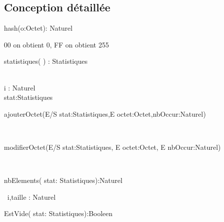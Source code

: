     \subsection*{Conception détaillée}
    
    \begin{function}
        \SetAlgoLined
        \caption{hash(o:Octet): Naturel} 
         00 on obtient 0, FF on obtient 255
    \end{function}

    \begin{function}
        \SetAlgoLined
        \caption{statistiques( ) :  Statistiques} 
        \Declaration \\
            i : Naturel\\
            stat:Statistiques\\
    \end{function}

        
    \begin{procedure}
        \SetAlgoLined
        \caption{ajouterOctet(E/S stat:Statistiques,E octet:Octet,nbOccur:Naturel)}
         \\
    \end{procedure}
        
    \begin{procedure}
        \SetAlgoLined
        \caption{modifierOctet(E/S stat:Statistiques, E octet:Octet, E nbOccur:Naturel)}
         \\
    \end{procedure}

    \begin{function}
        \SetAlgoLined
        \caption{nbElements( stat:  Statistiques):Naturel} 
        \Declaration\ i,taille : Naturel\\
    \end{function}

    \begin{function}
        \SetAlgoLined
        \caption{EstVide( stat:  Statistiques):Booleen} 
    \end{function}


